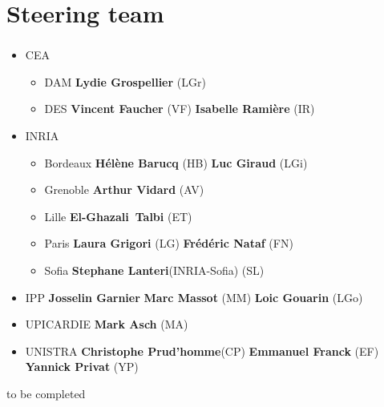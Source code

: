 \section{Steering team}
\begin{frame}
  \frametitle{\insertsectionhead}
  \framesubtitle{\insertsubsectionhead}
\scriptsize
  \begin{itemize}
    \item CEA 
    \begin{itemize}
      \item DAM \textbf{Lydie Grospellier} (LGr)
      \item DES \textbf{Vincent Faucher} (VF) \textbf{Isabelle Ramière} (IR)  
    \end{itemize}
    \item INRIA 
    \begin{itemize}
      \item Bordeaux \textbf{Hélène Barucq} (HB) \textbf{Luc Giraud} (LGi)
      \item  Grenoble \textbf{Arthur Vidard} (AV)
      \item Lille \textbf{El-Ghazali Talbi} (ET) 
      \item Paris \textbf{Laura Grigori} (LG) \textbf{Frédéric Nataf} (FN)
      \item Sofia \textbf{Stephane Lanteri}(INRIA-Sofia) (SL) 
    \end{itemize}
    \item IPP \textbf{Josselin Garnier} \textbf{Marc Massot} (MM) \textbf{Loic Gouarin} (LGo)
    \item UPICARDIE \textbf{Mark Asch} (MA)
    \item UNISTRA \textbf{Christophe Prud'homme}(CP) \textbf{Emmanuel Franck} (EF) \textbf{Yannick Privat} (YP)
  \end{itemize}
  \alert{to be completed}
\end{frame}